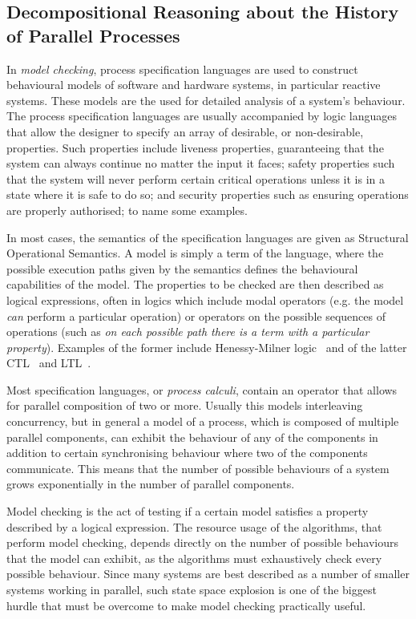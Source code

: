 
\subsection{Decompositional Reasoning about the History of Parallel Processes} %

In \emph{model checking}, process specification languages are used to construct
behavioural models of software and hardware systems, in particular reactive
systems. These models are the used
for detailed analysis of a system's behaviour. The process specification languages
are usually accompanied by logic languages that allow the designer to specify an
array of desirable, or non-desirable, properties. Such properties include liveness
properties, guaranteeing that the system can always continue no matter the input
it faces; safety properties such that the system will never perform certain critical
operations unless it is in a state where it is safe to do so; and security properties
such as ensuring operations are properly authorised; to name some examples.

In most cases, the semantics of the specification languages are given as Structural
Operational Semantics. A model is simply a term of the language, where the possible
execution paths given by the semantics defines the behavioural capabilities of
the model. The properties to be checked are then described as logical expressions,
often in logics which include modal operators (e.g. the model \emph{can} perform
a particular operation) or operators on the possible sequences of operations (such
as \emph{on each possible path there is a term with a particular property}).
Examples of the former include Henessy-Milner logic~\cite{Hennessy85} 
and of the latter CTL~\cite{CE81} and LTL~\cite{Pnueli77}.

Most specification languages, or \emph{process calculi}, contain an operator that
allows for parallel composition of two or more. Usually this models interleaving
concurrency, but in general a model of a process, which is composed of multiple
parallel components, can exhibit the behaviour of any of the components in addition
to certain synchronising behaviour where two of the components communicate.
This means that the number of possible behaviours of a system grows exponentially
in the number of parallel components.

Model checking is the act of testing if a certain model satisfies a property
described by a logical expression. The resource usage of the algorithms, that perform
model checking, depends directly on the number of possible behaviours that the
model can exhibit, as the algorithms must exhaustively check every possible
behaviour. Since many systems are best described as a number of smaller systems
working in parallel, such state space explosion is one of the biggest hurdle that
must be overcome to make model checking practically useful.

